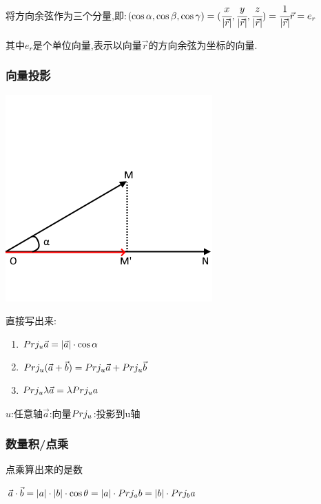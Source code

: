 {{{      将方向余弦作为三个分量,即:$(\cos\alpha,\cos\beta,\cos\gamma) = (\cfrac{x}{|\vec{r}|}, \cfrac{y}{|\vec{r}|}, \cfrac{z}{|\vec{r}|}) = \cfrac{1}{|\vec{r}|}\vec{r} = e_r$

      其中$e_r$是个单位向量,表示以向量$\vec{r}$的方向余弦为坐标的向量.

    }%

    \subsubsection{向量投影}{
      \begin{center}
        \includegraphics{resources/vector_axis_projection.png}
      \end{center}

      直接写出来:
      \begin{enumerate}
        \item $Prj_{u}\vec{a} = |\vec{a}|\cdot\cos\alpha$
        \item $Prj_{u}(\vec{a} + \vec{b}) = Prj_{u}\vec{a} + Prj_{u}\vec{b}$
        \item $Prj_{u}\lambda\vec{a} = \lambda Prj_{u}a$
      \end{enumerate}

      $u$:任意轴\qquad$\vec{a}$:向量\qquad$Prj_{u}$:投影到u轴

    }%

    \subsubsection{数量积/点乘}{
      点乘算出来的是数

      $\vec{a} \cdot \vec{b} = |a|\cdot|b|\cdot\cos\theta = |a|\cdot Prj_{a}b = |b|\cdot Prj_{b}a$

}}}
